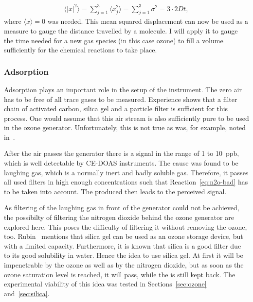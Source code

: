 \begin{align}
  \langle |x|^2 \rangle = \sum_{j=1}^3 \langle
  x_j^2 \rangle = \sum_{j=1}^3 \sigma^2 = 3 \cdot 2Dt, \label{eq:mqd}
\end{align}
where $\langle x \rangle = 0$ was needed. This mean squared
displacement can now be used as a measure to gauge the distance
travelled by a molecule. I will apply it to gauge the time needed for
a new gas species (in this case ozone) to fill a volume sufficiently
for the chemical reactions to take place.

\subsubsection{Adsorption}
\label{sec:adsorption}

Adsorption plays an important role in the setup of the instrument. The
zero air has to be free of all trace gases to be measured. Experience
shows that a filter chain of activated carbon, silica gel and a
particle filter is sufficient for this process. One would assume that
this air stream is also sufficiently pure to be used in the ozone
generator. Unfortunately, this is not true as was, for example, noted
in~\cite{bsc}.

After the air passes the generator there is a  signal in the
range of \num{1} to \SI{10}{ppb}, which is well detectable by CE-DOAS
instruments. The cause was found to be laughing gas, which is a
normally inert and badly soluble gas. Therefore, it passes all used
filters in high enough concentrations such that
Reaction~\eqref{eq:n2o-bad} has to be taken into account. The produced
 then leads to the perceived  signal.

As filtering of the laughing gas in front of the generator could not
be achieved, the possibilty of filtering the nitrogen dioxide behind
the ozone generator are explored here. This poses the difficulty of
filtering it without removing the ozone, too. Rubin~\cite{ozone-silica}
mentions that silica gel can be used as an ozone storage
device, but with a limited capacity. Furthermore, it is known that
silica is a good  filter due to its good solubility in
water. Hence the idea to use silica gel. At first it will be
impenetrable by the ozone as well as by the nitrogen dioxide, but as
soon as the ozone saturation level is reached, it will pass, while the
 is still kept back. The experimental viability of this idea
was tested in Sections~\ref{sec:ozone} and~\ref{sec:silica}.

